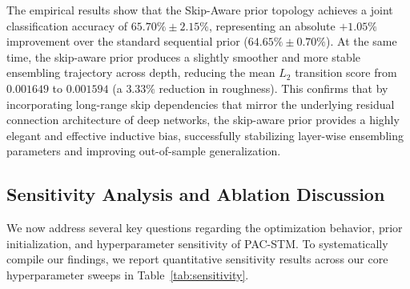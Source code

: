 \begin{sloppypar}
The empirical results show that the Skip-Aware prior topology achieves a joint classification accuracy of $65.70\% \pm 2.15\%$, representing an absolute \textbf{$+1.05\%$} improvement over the standard sequential prior ($64.65\% \pm 0.70\%$). At the same time, the skip-aware prior produces a slightly smoother and more stable ensembling trajectory across depth, reducing the mean $L_2$ transition score from $0.001649$ to $0.001594$ (a $3.33\%$ reduction in roughness). This confirms that by incorporating long-range skip dependencies that mirror the underlying residual connection architecture of deep networks, the skip-aware prior provides a highly elegant and effective inductive bias, successfully stabilizing layer-wise ensembling parameters and improving out-of-sample generalization.
\end{sloppypar}

\subsection{Sensitivity Analysis and Ablation Discussion}
\label{subsec:sensitivity_ablation}
We now address several key questions regarding the optimization behavior, prior initialization, and hyperparameter sensitivity of PAC-STM. To systematically compile our findings, we report quantitative sensitivity results across our core hyperparameter sweeps in Table~\ref{tab:sensitivity}.

